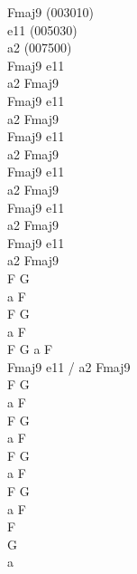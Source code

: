 \begin{chord}
\vin Fmaj9 (003010)\\
\vin e11 (005030)\\
\vin a2 (007500)\\
Fmaj9 e11\\
a2 Fmaj9\\
Fmaj9 e11\\
a2 Fmaj9\\

Fmaj9 e11\\
a2 Fmaj9\\
Fmaj9 e11\\
a2 Fmaj9\\

Fmaj9 e11\\
a2 Fmaj9\\
Fmaj9 e11\\
a2 Fmaj9\\

F G\\
a F\\
F G\\
a F\\
F G a F\\
Fmaj9 e11 / a2 Fmaj9\\

F G\\
a F\\
F G\\
a F\\

F G\\
a F\\
F G\\
a F\\
F\\
G\\
a\\
\end{chord}
